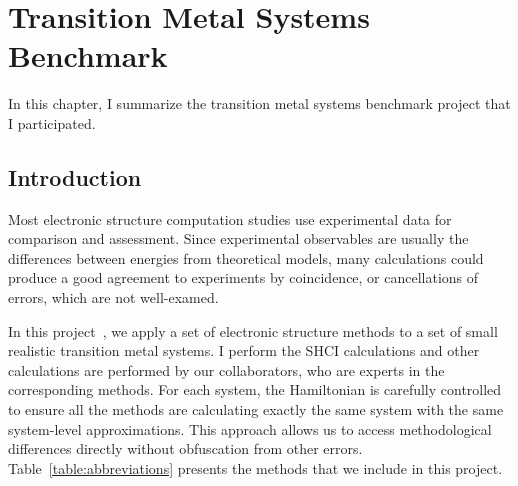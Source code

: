 \chapter{Transition Metal Systems Benchmark}
In this chapter, I summarize the transition metal systems benchmark project that I participated.
\label{ch:benchmark}
\section{Introduction}
Most electronic structure computation studies use experimental data for comparison and assessment.
Since experimental observables are usually the differences between energies from theoretical models, many calculations could produce a good agreement to experiments by coincidence, or cancellations of errors, which are not well-examed.

In this project~\cite{williams2019direct}, we apply a set of electronic structure methods to a set of small realistic transition metal systems.
I perform the SHCI calculations and other calculations are performed by our collaborators, who are experts in the corresponding methods.
For each system, the Hamiltonian is carefully controlled to ensure all the methods are calculating exactly the same system with the same system-level approximations.
This approach allows us to access methodological differences directly without obfuscation from other errors.
Table~\ref{table:abbreviations} presents the methods that we include in this project.

